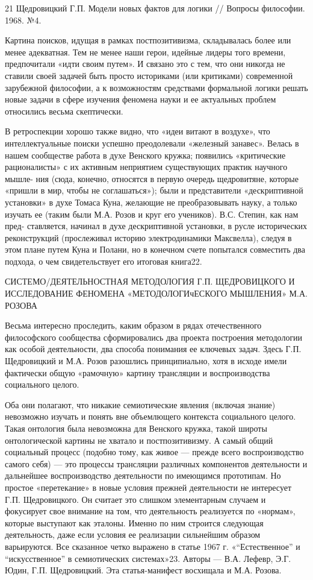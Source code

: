 \documentclass[11pt,a4paper]{article}
\begin{document}
21 Щедровицкий Г.П. Модели новых фактов для логики // Вопросы
философии. 1968. №4.

Картина поисков, идущая в рамках постпозитивизма, складывалась более или
менее адекватная. Тем не менее наши герои, идейные лидеры того времени,
предпочитали «идти своим путем». И связано это с тем, что они никогда не
ставили своей задачей быть просто историками (или критиками) современной
зарубежной философии, а к возможностям средствами формальной логики решать
новые задачи в сфере изучения феномена науки и ее актуальных проблем
относились весьма скептически.

В ретроспекции хорошо также видно, что «идеи витают в воздухе», что
интеллектуальные поиски успешно преодолевали «железный занавес». Велась в
нашем сообществе работа в духе Венского кружка; появились «критические
рационалисты» с их активным неприятием существующих практик научного мышле-
ния (сюда, конечно, относятся в первую очередь щедровитяне, которые «пришли в
мир, чтобы не соглашаться»); были и представители «дескриптивной установки»
в духе Томаса Куна, желающие не преобразовывать науку, а только изучать ее
(таким были М.А. Розов и круг его учеников). В.С. Степин, как нам пред-
ставляется, начинал в духе дескриптивной установки, в русле исторических
реконструкций (прослеживал историю электродинамики Максвелла), следуя в этом
плане путем Куна и Полани, но в конечном счете попытался совместить два
подхода, о чем свидетельствует его итоговая книга22.

СИСТЕМО/ДЕЯТЕЛЬНОСТНАЯ МЕТОДОЛОГИЯ Г.П. ЩЕДРОВИЦКОГО И ИССЛЕДОВАНИЕ ФЕНОМЕНА
«МЕТОДОЛОГИчЕСКОГО МЫШЛЕНИЯ» М.А. РОЗОВА

Весьма интересно проследить, каким образом в рядах отечественного
философского сообщества сформировались два проекта построения методологии как
особой деятельности, два способа понимания ее ключевых задач. Здесь
Г.П. Щедровицкий и М.А. Розов разошлись принципиально, хотя в исходе имели
фактически общую «рамочную» картину трансляции и воспроизводства социального
целого.

Оба они полагают, что никакие семиотические явления (включая знание)
невозможно изучать и понять вне объемлющего контекста социального
целого. Такая онтология была невозможна для Венского кружка, такой широты
онтологической картины не хватало и постпозитивизму. А самый общий
социальный процесс (подобно тому, как живое — прежде всего воспроизводство
самого себя) — это процессы трансляции различных компонентов деятельности и
дальнейшее воспроизводство деятельности по имеющимся прототипам. Но простое
«перетекание» в новые условия прежней деятельности не интересует
Г.П. Щедровицкого. Он считает это слишком элементарным случаем и фокусирует
свое внимание на том, что деятельность реализуется по «нормам», которые
выступают как эталоны. Именно по ним строится следующая деятельность, даже
если условия ее реализации сильнейшим образом варьируются. Все сказанное
четко выражено в статье 1967 г. «“Естественное” и “искусственное” в
семиотических системах»23. Авторы — В.А. Лефевр, Э.Г. Юдин,
Г.П. Щедровицкий. Эта статья-манифест восхищала и М.А. Розова.
\end{document}
